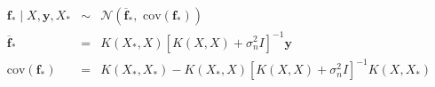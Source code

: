 \documentclass[10pt]{article}
\begin{document}
\begin{eqnarray*}
\mathbf{f}_* \mid X, \mathbf{y}, X_* &\sim& \mathcal{N}\left(\overline{\mathbf{f}}_*, \text{ cov}(\mathbf{f}_*)  \right) \\
\overline{\mathbf{f}}_* &=& K(X_*, X) \left[ K(X, X) + \sigma_n^2I \right]^{-1}\mathbf{y} \\
\text{cov}(\mathbf{f}_*) &=& K(X_*, X_*) - K(X_*, X)\left[ K(X, X) + \sigma_n^2I \right]^{-1}K(X, X_*)
\end{eqnarray*}
\end{document}
